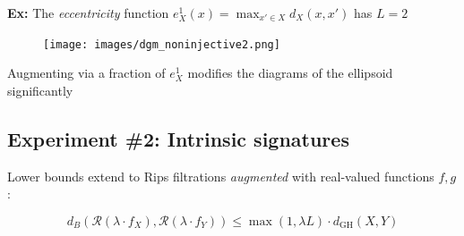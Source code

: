\documentclass[
  letterpaper,
  DIV=11,
  numbers=noendperiod,
  oneside]{scrartcl}
\begin{document}
\textbf{Ex:} The \emph{eccentricity} function
\(e_X^1(x) = \max_{x' \in X} d_X(x,x')\) has \(L = 2\)

\begin{figure}

{\centering \texttt{[image: images/dgm\_noninjective2.png]}

}

\end{figure}

Augmenting via a fraction of \(e_X^1\) modifies the diagrams of the
ellipsoid significantly

\subsection{Experiment \#2: Intrinsic
signatures}\label{experiment-2-intrinsic-signatures-6}

Lower bounds extend to Rips filtrations \emph{augmented} with
real-valued functions \(f, g\):

\[
d_B(\mathcal{R}(\lambda \cdot f_X), \mathcal{R}(\lambda \cdot f_Y)) \leq \max(1, \lambda L) \cdot d_{\mathrm{GH}}(X, Y)
\]

\begin{figure}

\begin{minipage}[t]{0.25\linewidth}

{\centering 


}

\end{minipage}%
%
\begin{minipage}[t]{0.25\linewidth}

{\centering 


}

\end{minipage}%
%
\begin{minipage}[t]{0.25\linewidth}

{\centering 


}

\end{minipage}%
%
\begin{minipage}[t]{0.25\linewidth}

{\centering 


}

\end{minipage}%

\end{figure}
\end{document}
